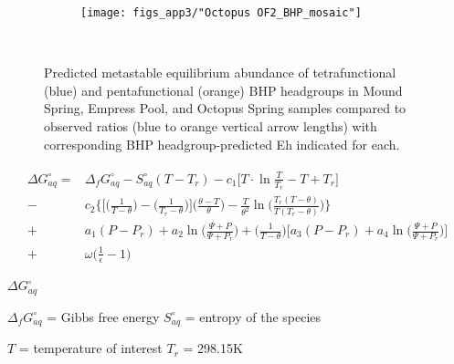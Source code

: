 \newpage

\begin{figure}[h]\ContinuedFloat
    \begin{subfigure}[b]{\linewidth}
        \texttt{[image: figs\_app3/"Octopus OF2\_BHP\_mosaic"]}
        \label{fig:OS2_degform}
    \end{subfigure}\\[-4ex]

\caption[Predicted metastable equilibrium abundance of tetrafunctional and pentafunctional BHP headgroups in Mound Spring, Empress Pool, and Octopus Spring samples]{Predicted metastable equilibrium abundance of tetrafunctional (blue) and pentafunctional (orange) BHP headgroups in Mound Spring, Empress Pool, and Octopus Spring samples compared to observed ratios (blue to orange vertical arrow lengths) with corresponding BHP headgroup-predicted Eh indicated for each.}
\label{fig:BHP_degree_formation}
\end{figure}


\begin{align}
\begin{split}
\Delta G^{\circ}_{aq} = & \Delta_{f}G^{\circ}_{aq} - S_{aq}^{\circ}(T - T_{r}) - c_{1}\Big[T \cdot \ln{\frac{T}{T_{r}}} - T + T_{r} \Big] \\
      - & c_{2}\Big\{\Big[\Big(\frac{1}{T - \theta}\Big) - \Big(\frac{1}{T_{r} - \theta}\Big) \Big] \Big( \frac{\theta - T}{\theta} \Big) - \frac{T}{\theta^{2}} \ln{\Big( \frac{T_{r}(T - \theta)}{T(T_{r} - \theta)} \Big)} \Big\} \\
      + & a_{1}(P - P_{r}) + a_{2}\ln{\Big(\frac{\Psi + P}{\Psi + P_{r}} \Big)} + \Big( \frac{1}{T - \theta} \Big)\Big[ a_{3}(P - P_{r}) + a_{4}\ln{\Big( \frac{\Psi + P}{\Psi + P_{r}} \Big)} \Big] \\
      + & \omega \Big( \frac{1}{\epsilon} - 1 \Big)
\end{split}
\end{align}

$\Delta G^{\circ}_{aq}$

$\Delta_{f}G^{\circ}_{aq}$ = Gibbs free energy
$S_{aq}^{\circ}$ = entropy of the species

$T$ = temperature of interest
$T_{r}$ = 298.15K
